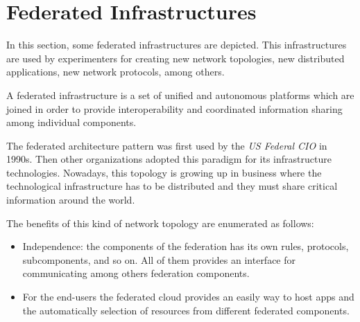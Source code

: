 \section{Federated Infrastructures}

In this section, some federated infrastructures are depicted. This
infrastructures are used by experimenters for creating new network topologies,
new distributed applications, new network protocols, among others.

A federated infrastructure is a set of unified and autonomous platforms which
are joined in order to provide interoperability and coordinated
information sharing among individual components. 

The federated architecture pattern was first used by the \emph{US Federal CIO} in
1990s. Then other organizations adopted this paradigm for its infrastructure
technologies. Nowadays, this topology is growing up in business where the
technological infrastructure has to be distributed and they must share critical
information around the world.

The benefits of this kind of network topology are enumerated as follows:
\begin{itemize}
\item Independence: the components of the federation has its own rules,
  protocols, subcomponents, and so on. All of them provides an interface for
  communicating among others federation components.
\item For the end-users the federated cloud provides an easily way to host apps
  and the automatically selection of resources from different federated components.
\end{itemize}

